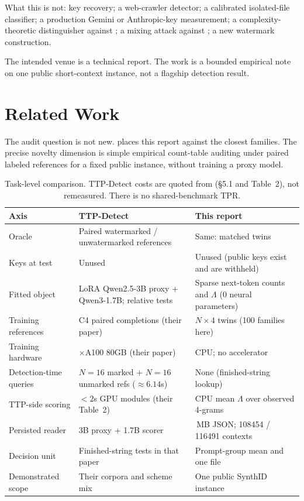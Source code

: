 \documentclass[11pt,a4paper]{article}
\theoremstyle{definition}
\newcommand{\LLR}{\Lambda}
\begin{document}
What this is not: key recovery; a web-crawler detector; a calibrated
isolated-file classifier; a production Gemini or Anthropic-key
measurement; a
complexity-theoretic distinguisher against
\citet{christ2024undetectable}; a mixing attack against
\citet{zhang2024sand}; a new watermark construction.

The intended venue is a technical report. The work is a bounded
empirical note on one public short-context instance, not a flagship
detection result.

\section{Related Work}
\label{sec:related}

The audit question is not new.  places this report
against the closest families. The precise novelty dimension is simple
empirical count-table auditing under paired labeled references for a
fixed public instance, without training a proxy model.

\begin{table}[t]
\centering
\small
\caption{Task-level comparison. TTP-Detect costs are quoted from
\citet{wang2026ttp} (\S5.1 and Table~2), not remeasured. There is no
shared-benchmark TPR.}
\label{tab:compare}
\begin{tabular}{>{\raggedright\arraybackslash}p{} >{\raggedright\arraybackslash}p{} >{\raggedright\arraybackslash}p{}}
\toprule
Axis & TTP-Detect \citep{wang2026ttp} & This report \\
\midrule
Oracle & Paired watermarked / unwatermarked references & Same: matched twins \\
Keys at test & Unused & Unused (public keys exist and are withheld) \\
Fitted object & LoRA Qwen2.5-3B proxy + Qwen3-1.7B; relative tests & Sparse next-token counts and $\LLR$ (0 neural parameters) \\
Training references & 6000 C4 paired completions (their paper) & $N\times 4$ twins (100 families here) \\
Training hardware & 2$\times$A100 80GB (their paper) & CPU; no accelerator \\
Detection-time queries & $N=16$ marked + $N=16$ unmarked refs ($\approx 6.14$s) & None (finished-string lookup) \\
TTP-side scoring & $<2$s GPU modules (their Table~2) & CPU mean $\LLR$ over observed 4-grams \\
Persisted reader & 3B proxy + 1.7B scorer & 33.2\,MB JSON; 108454 / 116491 contexts \\
Decision unit & Finished-string tests in that paper & Prompt-group mean and one file \\
Demonstrated scope & Their corpora and scheme mix & One public SynthID instance \\
\bottomrule
\end{tabular}
\end{table}
\end{document}
